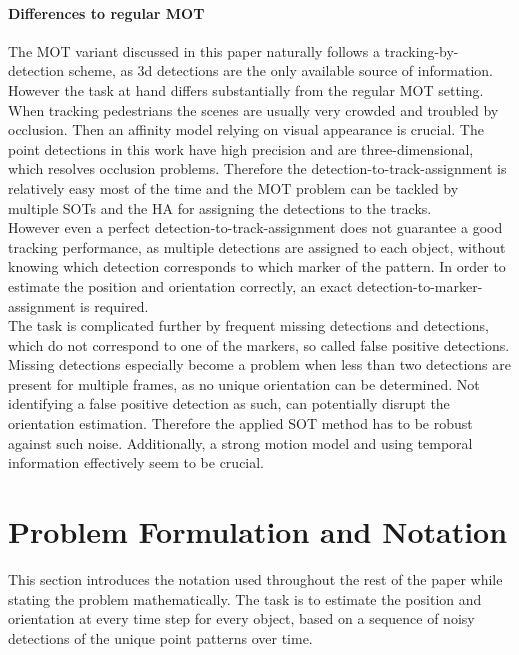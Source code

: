\documentclass{article}
\begin{document}
\paragraph{Differences to regular MOT} The MOT variant discussed in this paper naturally follows a tracking-by-detection scheme, as 3d detections are the only available source of information. However the task at hand differs substantially from the regular MOT setting. When tracking pedestrians the scenes are usually very crowded and troubled by occlusion. Then an affinity model relying on visual appearance is crucial. The point detections in this work have high precision and are three-dimensional, which resolves occlusion problems. Therefore the detection-to-track-assignment is relatively easy most of the time and the MOT problem can be tackled by multiple SOTs and the HA for assigning the detections to the tracks.\\
 However even a perfect detection-to-track-assignment does not guarantee a good tracking performance, as multiple detections are assigned to each object, without knowing which detection corresponds to which marker of the pattern. In order to estimate the position and orientation correctly, an exact detection-to-marker-assignment is required.\\
The task is complicated further by frequent missing detections and detections, which do not correspond to one of the markers, so called false positive detections. Missing detections especially become a problem when less than two detections are present for multiple frames, as no unique orientation can be determined. Not identifying a false positive detection as such, can potentially disrupt the orientation estimation. Therefore the applied SOT method has to be  robust against such noise. Additionally, a strong motion model and using temporal information effectively seem to be crucial. \\


\section{Problem Formulation and Notation}
\label{problem_def}

This section introduces the notation used throughout the rest of the paper while stating the problem mathematically. The task is to estimate the position and orientation at every time step for every object, based on a sequence of noisy detections of the unique point patterns over time. \\
\end{document}
